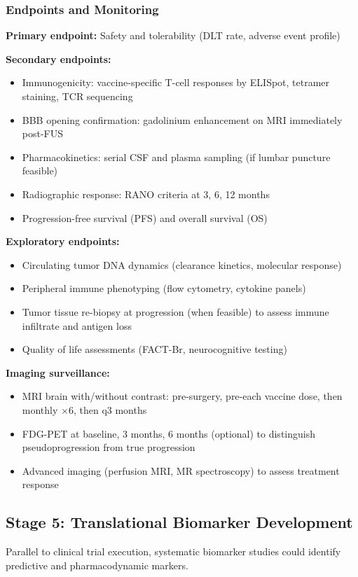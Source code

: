 \documentclass[12pt]{article}
\begin{document}
\subsubsection{Endpoints and Monitoring}
\textbf{Primary endpoint:} Safety and tolerability (DLT rate, adverse event profile)

\textbf{Secondary endpoints:}
\begin{itemize}[leftmargin=*,noitemsep]
\item Immunogenicity: vaccine-specific T-cell responses by ELISpot, tetramer staining, TCR sequencing
\item BBB opening confirmation: gadolinium enhancement on MRI immediately post-FUS
\item Pharmacokinetics: serial CSF and plasma sampling (if lumbar puncture feasible)
\item Radiographic response: RANO criteria at 3, 6, 12 months
\item Progression-free survival (PFS) and overall survival (OS)
\end{itemize}

\textbf{Exploratory endpoints:}
\begin{itemize}[leftmargin=*,noitemsep]
\item Circulating tumor DNA dynamics (clearance kinetics, molecular response)
\item Peripheral immune phenotyping (flow cytometry, cytokine panels)
\item Tumor tissue re-biopsy at progression (when feasible) to assess immune infiltrate and antigen loss
\item Quality of life assessments (FACT-Br, neurocognitive testing)
\end{itemize}

\textbf{Imaging surveillance:}
\begin{itemize}[leftmargin=*,noitemsep]
\item MRI brain with/without contrast: pre-surgery, pre-each vaccine dose, then monthly $\times$6, then q3 months
\item FDG-PET at baseline, 3 months, 6 months (optional) to distinguish pseudoprogression from true progression
\item Advanced imaging (perfusion MRI, MR spectroscopy) to assess treatment response
\end{itemize}

\subsection{Stage 5: Translational Biomarker Development}
Parallel to clinical trial execution, systematic biomarker studies could identify predictive and pharmacodynamic markers.
\end{document}
